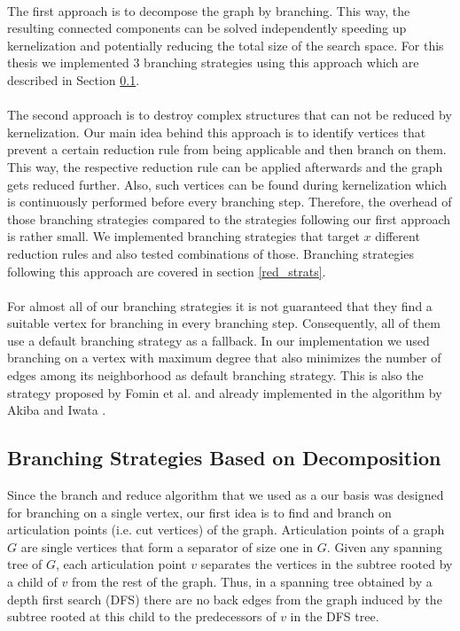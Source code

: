 \documentclass[]{article}
\begin{document}
\paragraph{}
The first approach is to decompose the graph by branching. This way, the resulting connected components can be solved independently speeding up kernelization and potentially reducing the total size of the search space. For this thesis we implemented 3 branching strategies using this approach which are described in Section \ref{decomp}.
\paragraph{}
The second approach is to destroy complex structures that can not be reduced by kernelization. Our main idea behind this approach is to identify vertices that prevent a certain reduction rule from being applicable and then branch on them. This way, the respective reduction rule can be applied afterwards and the graph gets reduced further. Also, such vertices can be found during kernelization which is continuously performed before every branching step. Therefore, the overhead of those branching strategies compared to the strategies following our first approach is rather small. We implemented branching strategies that target $x$ different reduction rules and also tested combinations of those. Branching strategies following this approach are covered in section \ref{red_strats}.
\paragraph{}

For almost all of our branching strategies it is not guaranteed that they find a suitable vertex for branching in every branching step. Consequently, all of them use a default branching strategy as a fallback. In our implementation we used branching on a vertex with maximum degree that also minimizes the number of edges among its neighborhood  as default branching strategy. This is also the strategy proposed by Fomin et al. \cite{Fomin} and already implemented in the algorithm by Akiba and Iwata \cite{AkibaIwata}.

\subsection{Branching Strategies Based on Decomposition} \label{decomp}
Since the branch and reduce algorithm that we used as a our basis was designed for branching on a single vertex, our first idea is to find and branch on articulation points  (i.e. cut vertices) of the graph. Articulation points of a graph $G$ are single vertices that form a separator of size one in $G$. Given any spanning tree of $G$, each articulation point $v$ separates the vertices in the subtree rooted by a child of $v$ from the rest of the graph. Thus, in a spanning tree obtained by a depth first search (DFS) there are no back edges from the graph induced by the subtree rooted at this child to the predecessors of $v$ in the DFS tree.
\end{document}
